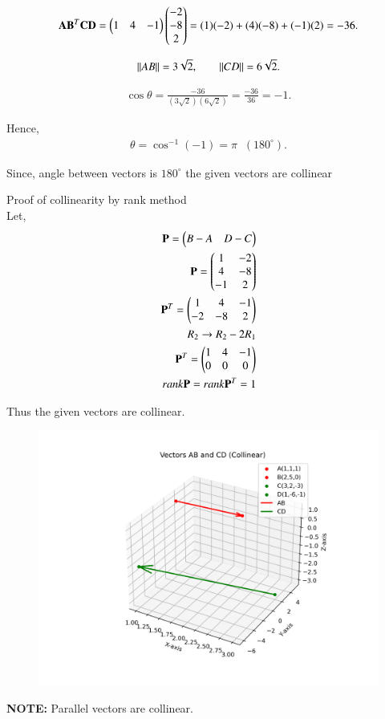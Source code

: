 \documentclass[journal]{IEEEtran}
\begin{document}
\begin{align}
\mathbf{AB}^T \mathbf{CD} =
\begin{pmatrix}1 & 4 & -1\end{pmatrix}
\begin{pmatrix}-2\\-8\\2\end{pmatrix}
= (1)(-2)+(4)(-8)+(-1)(2) = -36.
\end{align}

\begin{align}
\left\lVert AB\right\rVert =3\sqrt{2}, 
\qquad
\left\lVert CD\right\rVert = 6\sqrt{2}.
\end{align}

\begin{align}
\cos\theta = \frac{-36}{(3\sqrt{2})(6\sqrt{2})} 
= \frac{-36}{36}=-1.
\end{align}

Hence,
\begin{align}
\theta = \cos^{-1}(-1) = \pi \;\;(180^\circ).
\end{align}

Since, angle between vectors is $180^\circ$ the given vectors are collinear

\newpage
Proof of collinearity by rank method \\
Let, 
\begin{align}
    \mathbf{P}=\begin{pmatrix}B-A & D-C\end{pmatrix} \\ 
    \mathbf{P}=\begin{pmatrix}1 & -2 \\ 
                   4 & -8 \\
                   -1 & 2\end{pmatrix} \\ 
    \mathbf{P}^T=\begin{pmatrix}1 & 4 & -1 \\
                     -2 & -8 & 2\end{pmatrix} \\ 
    R_2 \rightarrow R_2 - 2R_1 \\ 
    \mathbf{P}^T = \begin{pmatrix}1 & 4 & -1 \\ 
                       0 & 0 & 0\end{pmatrix} \\ 
    rank\mathbf{P}=rank\mathbf{P}^T = 1 \\ 
\end{align}

Thus the given vectors are collinear.


\begin{figure}[H]
    \centering
    \includegraphics[width=1\columnwidth]{Figs/fig1.png}
    \caption{}
    \label{fig:placeholder}
\end{figure}

\textbf{NOTE:} Parallel vectors are collinear.
\end{document}
